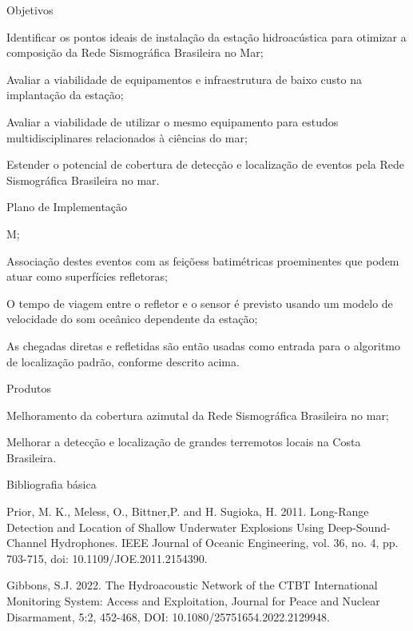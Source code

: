 \documentclass[10pt,a4paper,oneside]{book}
\begin{document}
\begin{fancyenum}{\faFutbol}{Objetivos}
	\item Identificar os pontos ideais de instalação da estação hidroacústica para otimizar a composição da Rede Sismográfica Brasileira no Mar;
	\item Avaliar a viabilidade de equipamentos e infraestrutura de baixo custo na implantação da estação;
	\item Avaliar a viabilidade de utilizar o mesmo equipamento para estudos multidisciplinares relacionados à ciências do mar;
	\item Estender o potencial de cobertura de detecção e localização de eventos pela Rede Sismográfica Brasileira no mar.
\end{fancyenum}


\begin{fancyenum}{\faBrain}{Plano de Implementação}
	\item M;
	\item Associação destes eventos com as feiçõess batimétricas proeminentes que podem atuar como superfícies refletoras;
	\item O tempo de viagem entre o refletor e o sensor é previsto usando um modelo de velocidade do som oceânico dependente da estação;
	\item As chegadas diretas e refletidas são então usadas como entrada para o algoritmo de localização padrão, conforme descrito acima.
\end{fancyenum}

\begin{fancyenum}{\faShoppingCart}{Produtos}
	\item Melhoramento da cobertura azimutal da Rede Sismográfica Brasileira no mar;
	\item Melhorar a detecção e localização de grandes terremotos locais na Costa Brasileira.
\end{fancyenum}

\begin{fancyenum}{\faBook}{Bibliografia básica}
	\item Prior, M. K., Meless, O., Bittner,P. and H. Sugioka, H. 2011. Long-Range Detection and Location of Shallow Underwater Explosions Using Deep-Sound-Channel Hydrophones. IEEE Journal of Oceanic Engineering, vol. 36, no. 4, pp. 703-715, doi: 10.1109/JOE.2011.2154390.
	\item Gibbons, S.J. 2022. The Hydroacoustic Network of the CTBT International Monitoring System: Access and Exploitation, Journal for Peace and Nuclear Disarmament, 5:2, 452-468, DOI: 10.1080/25751654.2022.2129948.
\end{fancyenum}
\end{document}
